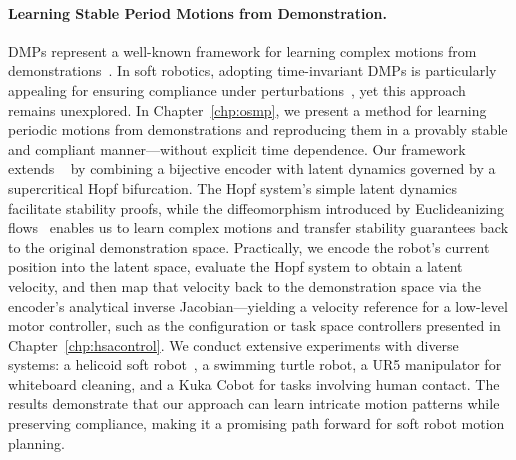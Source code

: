 \paragraph{Learning Stable Period Motions from Demonstration.}
\glspl{DMP} represent a well-known framework for learning complex motions from demonstrations~\citep{ijspeert2013dynamical, saveriano2023dynamic}. In soft robotics, adopting time-invariant \glspl{DMP} is particularly appealing for ensuring compliance under perturbations~\citep{ijspeert2013dynamical}, yet this approach remains unexplored. In Chapter~\ref{chp:osmp}, we present a method for learning periodic motions from demonstrations and reproducing them in a provably stable and compliant manner—without explicit time dependence.
% 
Our framework extends ~\citep{ijspeert2013dynamical, rana2020euclideanizing, perez2023stable} by combining a bijective encoder with latent dynamics governed by a supercritical Hopf bifurcation. The Hopf system’s simple latent dynamics facilitate stability proofs, while the diffeomorphism introduced by Euclideanizing flows~\citep{dinh2016density, rana2020euclideanizing} enables us to learn complex motions and transfer stability guarantees back to the original demonstration space. Practically, we encode the robot’s current position into the latent space, evaluate the Hopf system to obtain a latent velocity, and then map that velocity back to the demonstration space via the encoder’s analytical inverse Jacobian—yielding a velocity reference for a low-level motor controller, such as the configuration or task space controllers presented in Chapter~\ref{chp:hsacontrol}.
% 
We conduct extensive experiments with diverse systems: a helicoid soft robot~\citep{guan2023trimmed}, a swimming turtle robot, a UR5 manipulator for whiteboard cleaning, and a Kuka \gls{Cobot} for tasks involving human contact. The results demonstrate that our approach can learn intricate motion patterns while preserving compliance, making it a promising path forward for soft robot motion planning.